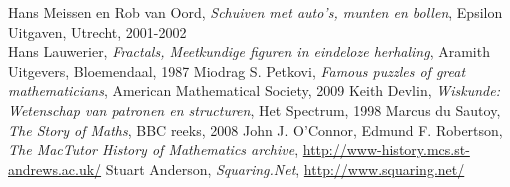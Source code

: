 
\begin{thebibliography}{1}
\label{1} Hans Meissen en Rob van Oord, \textit{Schuiven met auto's, munten en bollen}, Epsilon Uitgaven, Utrecht, 2001-2002\\
\label{2} Hans Lauwerier, \textit{Fractals, Meetkundige figuren in eindeloze herhaling}, Aramith Uitgevers, Bloemendaal, 1987
\label{3} Miodrag S. Petkovi, \textit{Famous puzzles of great mathematicians}, American Mathematical Society, 2009
\label{4} Keith Devlin, \textit{Wiskunde: Wetenschap van patronen en structuren}, Het Spectrum, 1998
\label{5} Marcus du Sautoy, \textit{The Story of Maths}, BBC reeks, 2008
\label{6} John J. O'Connor, Edmund F. Robertson, \textit{The MacTutor History of Mathematics archive}, \url{http://www-history.mcs.st-andrews.ac.uk/}
\label{7} Stuart Anderson, \textit{Squaring.Net}, \url{http://www.squaring.net/}
\end{thebibliography}
